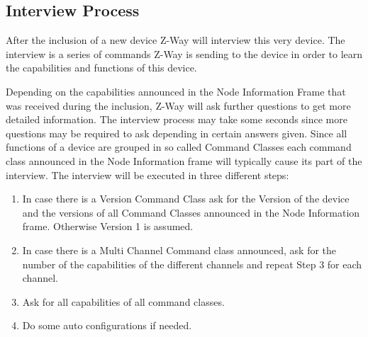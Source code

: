 \subsection{Interview Process}
After the inclusion of a new device Z-Way will interview this very device. The interview is a series of commands Z-Way is sending 
to the device in order to learn the capabilities and functions of this device.


Depending on the capabilities announced in the Node Information Frame that was received during the inclusion, Z-Way will ask further 
questions to get more detailed information. The interview process may take some seconds since more questions may be required to ask depending in certain answers given.
Since all functions of a device are grouped in so called Command Classes each command class announced in the Node Information frame will typically cause its part of the interview.
The interview will be executed in three different steps:

\begin{enumerate}
\item In case there is a Version Command Class ask for the Version of the device and the versions of all Command Classes announced in the Node Information frame. Otherwise Version 1 is assumed.
\item In case there is a Multi Channel Command class announced, ask for the number of the capabilities of the different channels and repeat Step 3 for each channel.
\item Ask for all capabilities of all command classes.
\item Do some auto configurations if needed.
\end{enumerate}

